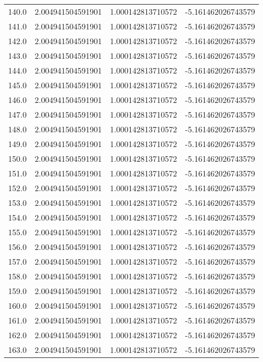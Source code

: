 \begin{longtable}{lrrr}
140.0 & 2.004941504591901 & 1.000142813710572 & -5.161462026743579 \\
141.0 & 2.004941504591901 & 1.000142813710572 & -5.161462026743579 \\
142.0 & 2.004941504591901 & 1.000142813710572 & -5.161462026743579 \\
143.0 & 2.004941504591901 & 1.000142813710572 & -5.161462026743579 \\
144.0 & 2.004941504591901 & 1.000142813710572 & -5.161462026743579 \\
145.0 & 2.004941504591901 & 1.000142813710572 & -5.161462026743579 \\
146.0 & 2.004941504591901 & 1.000142813710572 & -5.161462026743579 \\
147.0 & 2.004941504591901 & 1.000142813710572 & -5.161462026743579 \\
148.0 & 2.004941504591901 & 1.000142813710572 & -5.161462026743579 \\
149.0 & 2.004941504591901 & 1.000142813710572 & -5.161462026743579 \\
150.0 & 2.004941504591901 & 1.000142813710572 & -5.161462026743579 \\
151.0 & 2.004941504591901 & 1.000142813710572 & -5.161462026743579 \\
152.0 & 2.004941504591901 & 1.000142813710572 & -5.161462026743579 \\
153.0 & 2.004941504591901 & 1.000142813710572 & -5.161462026743579 \\
154.0 & 2.004941504591901 & 1.000142813710572 & -5.161462026743579 \\
155.0 & 2.004941504591901 & 1.000142813710572 & -5.161462026743579 \\
156.0 & 2.004941504591901 & 1.000142813710572 & -5.161462026743579 \\
157.0 & 2.004941504591901 & 1.000142813710572 & -5.161462026743579 \\
158.0 & 2.004941504591901 & 1.000142813710572 & -5.161462026743579 \\
159.0 & 2.004941504591901 & 1.000142813710572 & -5.161462026743579 \\
160.0 & 2.004941504591901 & 1.000142813710572 & -5.161462026743579 \\
161.0 & 2.004941504591901 & 1.000142813710572 & -5.161462026743579 \\
162.0 & 2.004941504591901 & 1.000142813710572 & -5.161462026743579 \\
163.0 & 2.004941504591901 & 1.000142813710572 & -5.161462026743579 \\

\end{longtable}

